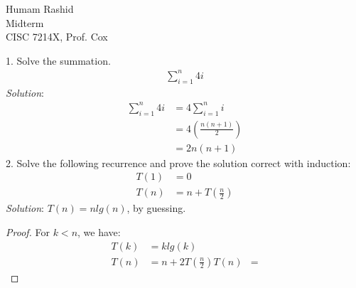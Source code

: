 \documentclass{scrartcl}
\begin{document}
\begin{flushleft}

    Humam Rashid\\
    Midterm\\
    CISC 7214X, Prof. Cox\\
    \bigskip
    
    1. Solve the summation.
    \begin{align*}
        \sum_{i=1}^{n} 4i
    \end{align*}
    \textit{Solution}:
    \begin{align*}
        \sum_{i=1}^{n} 4i &= 4 \sum_{i=1}^{n} i\\
                          &= 4 (\frac{n (n + 1)}{2})\\
                          &= 2n(n + 1)
    \end{align*}
    2. Solve the following recurrence and prove the solution correct with induction:
    \begin{align*}
        T(1) &= 0\\
        T(n) &= n + T(\frac{n}{2})
    \end{align*}
    \textit{Solution}: $T(n) = n lg(n)$, by guessing.
    \bigskip
    \begin{proof}
        For $k < n$, we have:\\
        \begin{align*}
            T(k) &= k lg(k)\\
            T(n) &= n + 2 T(\frac{n}{2})
            T(n) &= 
        \end{align*}
    \end{proof}

\end{flushleft}
\end{document}
